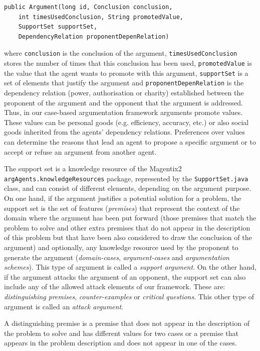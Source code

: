 \begin{lstlisting}
public Argument(long id, Conclusion conclusion,
	int timesUsedConclusion, String promotedValue,
	SupportSet supportSet,
	DependencyRelation proponentDepenRelation)
\end{lstlisting}
where \texttt{conclusion} is the conclusion of the argument, \texttt{timesUsedConclusion} stores the number of times that this conclusion has been used, \texttt{promotedValue} is the value that the agent wants to promote with this argument, \texttt{supportSet} is a set of elements that justify the argument and \texttt{proponentDepenRelation} is the dependency relation (power, authorisation or charity) established between the proponent of the argument and the opponent that the argument is addressed. Thus, in our case-based argumentation framework arguments promote values. These values can be personal goods (e.g. efficiency, accuracy, etc.) or also social goods inherited from the agents' dependency relations. Preferences over values can determine the reasons that lead an agent to propose a specific argument or to accept or refuse an argument from another agent.

The support set is a knowledge resource of the Magentix2 \lstinline{argAgents.knowledgeResources} package, represented by the \lstinline{SupportSet.java} class, and can consist of different elements, depending on the argument purpose. On one hand, if the argument justifies a potential solution for a problem, the support set is the set of features (\emph{premises}) that represent the context of the domain where the argument has been put forward (those premises that match the problem to solve and other extra premises that do not appear in the description of this problem but that have been also considered to draw the conclusion of the argument) and optionally, any knowledge resource used by the proponent to generate the argument (\emph{domain-cases}, \emph{argument-cases} and \emph{argumentation schemes}). This type of argument is called a \emph{support argument}. On the other hand, if the argument attacks the argument of an opponent, the support set can also include any of the allowed attack elements of our framework. These are: \emph{distinguishing premises}, \emph{counter-examples} or \emph{critical questions}. This other type of argument is called an \emph{attack argument}.

\begin{definition}
 A distinguishing premise is a premise that does not appear in the description of the problem to solve and has different values for two cases or a premise that appears in the problem description and does not appear in one of the cases. %
\end{definition}

